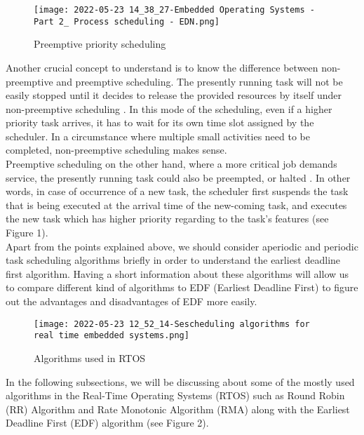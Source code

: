 \documentclass[conference]{IEEEtran}
\begin{document}
\begin{figure}[h]
    \centering
    \texttt{[image: 2022-05-23 14\_38\_27-Embedded Operating Systems - Part 2\_ Process scheduling - EDN.png]}
    \caption{Preemptive priority scheduling \cite{EDN}}
    \label{fig:Hierarchy}
\end{figure}

Another crucial concept to understand is to know the difference between non-preemptive and preemptive scheduling. The presently running task will not be easily stopped until it decides to release the provided resources by itself under non-preemptive scheduling \cite{rts}. In this mode of the scheduling, even if a higher priority task arrives, it has to wait for its own time slot assigned by the scheduler. In a circumstance where multiple small activities need to be completed, non-preemptive scheduling makes sense.\\

Preemptive scheduling on the other hand, where a more critical job demands service, the presently running task could also be preempted, or halted \cite{rts}. In other words, in case of occurrence of a new task, the scheduler first suspends the task that is being executed at the arrival time of the new-coming task, and executes the new task which has higher priority regarding to the task's features (see Figure 1). \\

Apart from the points explained above, we should consider aperiodic and periodic task scheduling algorithms briefly in order to understand the earliest deadline first algorithm. Having a short information about these algorithms will allow us to compare different kind of algorithms to EDF (Earliest Deadline  First) to figure out the advantages and disadvantages of EDF more easily. \\

\begin{figure}[h]
    \centering
    \texttt{[image: 2022-05-23 12\_52\_14-Sescheduling algorithms for real time embedded systems.png]}
    \caption{Algorithms used in RTOS \cite{mic}}
    \label{fig:Hierarchy}
\end{figure}

In the following subsections, we will be discussing about some of the mostly used algorithms in the Real-Time Operating Systems (RTOS) such as Round Robin (RR) Algorithm and Rate Monotonic Algorithm (RMA) along with the Earliest Deadline First (EDF) algorithm (see Figure 2).  \\
\end{document}
